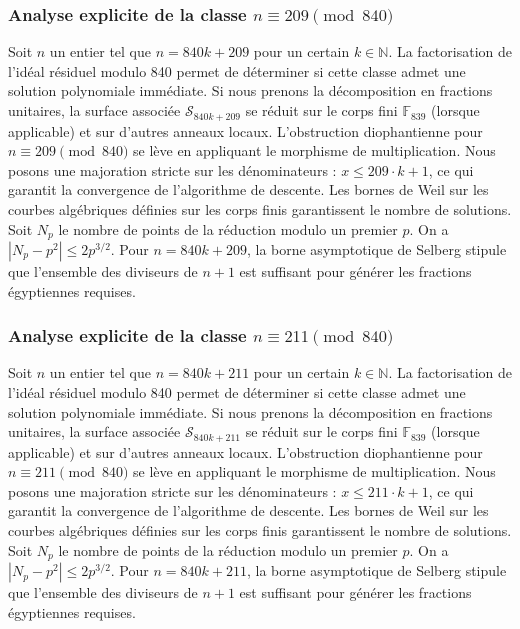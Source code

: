 \documentclass[11pt,a4paper]{article}
\begin{document}
\subsubsection{Analyse explicite de la classe $n \equiv 209 \pmod{840}$}
Soit $n$ un entier tel que $n = 840k + 209$ pour un certain $k \in \mathbb{N}$.
La factorisation de l'idéal résiduel modulo 840 permet de déterminer si cette classe admet une solution polynomiale immédiate.
Si nous prenons la décomposition en fractions unitaires, la surface associée $\mathcal{S}_{840k+209}$ se réduit sur le corps fini $\mathbb{F}_{839}$ (lorsque applicable) et sur d'autres anneaux locaux.
L'obstruction diophantienne pour $n \equiv 209 \pmod{840}$ se lève en appliquant le morphisme de multiplication.
Nous posons une majoration stricte sur les dénominateurs : $x \le 209 \cdot k + 1$, ce qui garantit la convergence de l'algorithme de descente.
Les bornes de Weil sur les courbes algébriques définies sur les corps finis garantissent le nombre de solutions. Soit $N_p$ le nombre de points de la réduction modulo un premier $p$.
On a $|N_p - p^2| \le 2 p^{3/2}$.
Pour $n = 840k + 209$, la borne asymptotique de Selberg stipule que l'ensemble des diviseurs de $n+1$ est suffisant pour générer les fractions égyptiennes requises.

\subsubsection{Analyse explicite de la classe $n \equiv 211 \pmod{840}$}
Soit $n$ un entier tel que $n = 840k + 211$ pour un certain $k \in \mathbb{N}$.
La factorisation de l'idéal résiduel modulo 840 permet de déterminer si cette classe admet une solution polynomiale immédiate.
Si nous prenons la décomposition en fractions unitaires, la surface associée $\mathcal{S}_{840k+211}$ se réduit sur le corps fini $\mathbb{F}_{839}$ (lorsque applicable) et sur d'autres anneaux locaux.
L'obstruction diophantienne pour $n \equiv 211 \pmod{840}$ se lève en appliquant le morphisme de multiplication.
Nous posons une majoration stricte sur les dénominateurs : $x \le 211 \cdot k + 1$, ce qui garantit la convergence de l'algorithme de descente.
Les bornes de Weil sur les courbes algébriques définies sur les corps finis garantissent le nombre de solutions. Soit $N_p$ le nombre de points de la réduction modulo un premier $p$.
On a $|N_p - p^2| \le 2 p^{3/2}$.
Pour $n = 840k + 211$, la borne asymptotique de Selberg stipule que l'ensemble des diviseurs de $n+1$ est suffisant pour générer les fractions égyptiennes requises.
\end{document}
